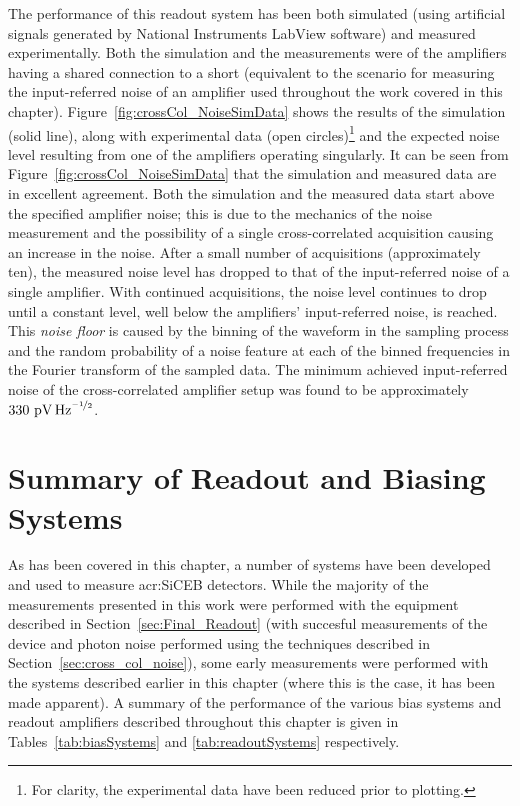The performance of this readout system has been both simulated (using artificial signals generated by National Instruments LabView software) and measured experimentally. Both the simulation and the measurements were of the amplifiers having a shared connection to a short (equivalent to the scenario for measuring the input-referred noise of an amplifier used throughout the work covered in this chapter). Figure~\ref{fig:crossCol_NoiseSimData} shows the results of the simulation (solid line), along with experimental data (open circles)\footnote{For clarity, the experimental data have been reduced prior to plotting.} and the expected noise level resulting from one of the amplifiers operating singularly. It can be seen from Figure~\ref{fig:crossCol_NoiseSimData} that the simulation and measured data are in excellent agreement. Both the simulation and the measured data start above the specified amplifier noise; this is due to the mechanics of the noise measurement and the possibility of a single cross-correlated acquisition causing an increase in the noise. After a small number of acquisitions (approximately ten), the measured noise level has dropped to that of the input-referred noise of a single amplifier. With continued acquisitions, the noise level continues to drop until a constant level, well below the amplifiers' input-referred noise, is reached. This \textit{noise floor} is caused by the binning of the waveform in the sampling process and the random probability of a noise feature at each of the binned frequencies in the Fourier transform of the sampled data. The minimum achieved input-referred noise of the cross-correlated amplifier setup was found to be approximately $330~\mathrm{pV\,Hz}^{\nicefrac{-1}{2}}$.
%
\section{Summary of Readout and Biasing Systems}
As has been covered in this chapter, a number of systems have been developed and used to measure \gls{acr:SiCEB} detectors. While the majority of the measurements presented in this work were performed with the equipment described in Section~\ref{sec:Final_Readout} (with succesful measurements of the device and photon noise performed using the techniques described in Section~\ref{sec:cross_col_noise}), some early measurements were performed with the systems described earlier in this chapter (where this is the case, it has been made apparent). A summary of the performance of the various bias systems and readout amplifiers described throughout this chapter is given in Tables~\ref{tab:biasSystems} and \ref{tab:readoutSystems} respectively.

